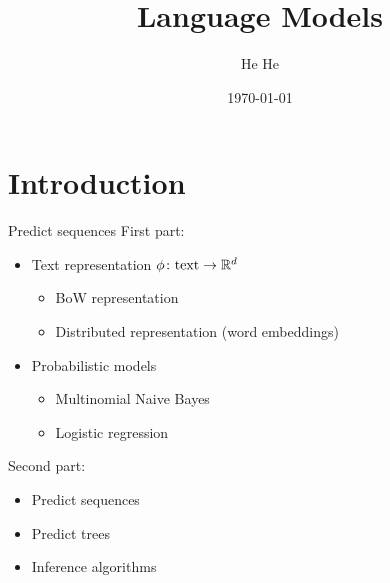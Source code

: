 \documentclass[usenames,dvipsnames,notes]{beamer}
\title[CSCI-GA.2590]{Language Models}
\author[He He]{He He
}
\institute[NYU]{New York University}
\date{\today}
\begin{document}
\begin{frame}
\titlepage
\end{frame}

\section{Introduction}

\begin{frame}
    {Predict sequences}
    First part:\\
    \begin{itemize}
        \item Text representation $\phi\colon \text{text} \rightarrow \mathbb{R}^d$
            \begin{itemize}
                \item BoW representation
                \item Distributed representation (word embeddings)
            \end{itemize}
        \item Probabilistic models
            \begin{itemize}
                \item Multinomial Naive Bayes
                \item Logistic regression
            \end{itemize}
    \end{itemize}

    Second part:\\
    \begin{itemize}
        \item Predict sequences
        \item Predict trees
        \item Inference algorithms
    \end{itemize}
\end{frame}
\end{document}
